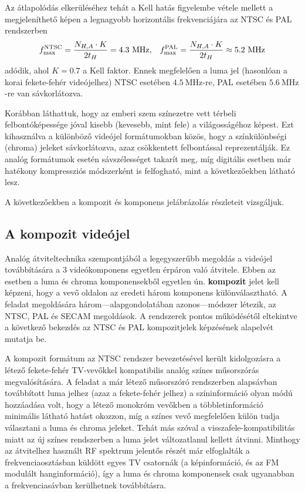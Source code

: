 Az átlapolódás elkerüléséhez tehát a Kell hatás figyelembe vétele mellett a megjeleníthető képen a legnagyobb horizontális frekvenciájára az NTSC és PAL rendszerben
\begin{equation}
f^{\mathrm{NTSC}}_{\mathrm{max}} = \frac{N_{H,A} \cdot K}{2 t_H} = 4.3~\mathrm{MHz},
\hspace{3mm}
f^{\mathrm{PAL}}_{\mathrm{max}} = \frac{N_{H,A} \cdot K}{2 t_H} \approx 5.2 ~\mathrm{MHz}
\end{equation}
adódik, ahol $K = 0.7$ a Kell faktor.
Ennek megfelelően a luma jel (hasonlóan a korai fekete-fehér videójelhez) NTSC esetében $4.5~\mathrm{MHz}$-re, PAL esetében $5.6~\mathrm{MHz}$-re van sávkorlátozva.

Korábban láthattuk, hogy az emberi szem színezetre vett térbeli felbontóképessége jóval kisebb (kevesebb, mint fele) a világosságéhoz képest.
Ezt kihasználva a különböző videójel formátumokban közös, hogy a színkülönbségi (chroma) jeleket sávkorlátozva, azaz csökkentett felbontással reprezentálják.
Ez analóg formátumok esetén sávszélességet takarít meg, míg digitális esetben már hatékony kompressziós módszerként is felfogható, mint a következőekben látható lesz.

A következőekben a kompozit és komponens jelábrázolás részleteit vizsgáljuk.

\subsection{A kompozit videójel}
Analóg átviteltechnika szempontjából a legegyszerűbb megoldás a videójel továbbítására a 3 videókomponens egyetlen érpáron való átvitele.
Ebben az esetben a luma és chroma komponensekből egyetlen ún. \textbf{kompozit} jelet kell képzeni, hogy a vevő oldalon az eredeti három komponens különválasztható.
A feladat megoldására három---alapgondolatában azonos---módszer létezik, az NTSC, PAL és SECAM megoldások.
A rendszerek pontos működésétől eltekintve a következő bekezdés az NTSC és PAL kompozitjelek képzésének alapelvét mutatja be.

A kompozit formátum az NTSC rendszer bevezetésével került kidolgozásra a létező fekete-fehér TV-vevőkkel kompatibilis analóg színes műsorszórás megvalósítására.
A feladat a már létező műsorszóró rendszerben alapsávban továbbított luma jelhez (azaz a fekete-fehér jelhez) a színinformáció olyan módú hozzáadása volt, hogy a létező monokróm vevőkben a többletinformáció minimális látható hatást okozzon, míg a színes vevő megfelelően külön tudja választani a luma és chroma jeleket.
Tehát más szóval a visszafele-kompatibilitás miatt az új színes rendszerben a luma jelet változatlanul kellett átvinni. 
Minthogy az átvitelhez használt RF spektrum jelentős részét már elfoglalták a frekvenciaosztásban küldött egyes TV csatornák (a képinformáció, és az FM modulált hanginformáció), így a luma és chroma komponensek csak ugyanabban a frekvenciasávban kerülhetnek továbbításra.

